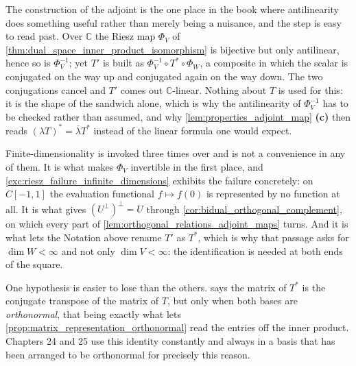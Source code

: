 
\begin{ainote}
The construction of the adjoint is the one place in the book where antilinearity
does something useful rather than merely being a nuisance, and the step is easy
to read past. Over $\mathbb{C}$ the Riesz map $\Phi_V$ of
\cref{thm:dual_space_inner_product_isomorphism} is bijective but only
antilinear, hence so is $\Phi_V^{-1}$; yet $T'$ is built as
$\Phi_V^{-1} \circ T^* \circ \Phi_W$, a composite in which the scalar is
conjugated on the way up and conjugated again on the way down. The two
conjugations cancel and $T'$ comes out $\mathbb{C}$-linear. Nothing about $T$ is
used for this: it is the shape of the sandwich alone, which is why the
antilinearity of $\Phi_V^{-1}$ has to be checked rather than assumed, and why
\cref{lem:properties_adjoint_map} \textbf{(c)} then reads
$(\lambda T)^* = \overline{\lambda} T^*$ instead of the linear formula one would
expect.

Finite-dimensionality is invoked three times over and is not a convenience in
any of them. It is what makes $\Phi_V$ invertible in the first place, and
\cref{exc:riesz_failure_infinite_dimensions} exhibits the failure concretely: on
$C[-1,1]$ the evaluation functional $f \mapsto f(0)$ is represented by no
function at all. It is what gives $(U^\perp)^\perp = U$ through
\cref{cor:bidual_orthogonal_complement}, on which every part of
\cref{lem:orthogonal_relations_adjoint_maps} turns. And it is what lets the
Notation above rename $T'$ as $T^*$, which is why that passage asks for
$\dim W < \infty$ and not only $\dim V < \infty$: the identification is needed
at both ends of the square.

One hypothesis is easier to lose than the others.
 says the matrix of $T^*$ is the
conjugate transpose of the matrix of $T$, but only when both bases are
\emph{orthonormal}, that being exactly what lets
\cref{prop:matrix_representation_orthonormal} read the entries off the inner
product. Chapters 24 and 25 use this identity constantly and always in a basis
that has been arranged to be orthonormal for precisely this reason.
\end{ainote}


